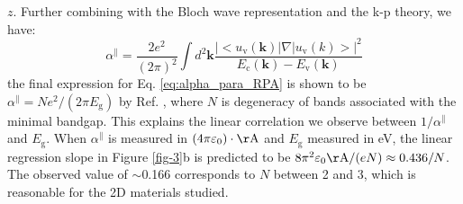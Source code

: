 \documentclass[journal=ancac3,manuscript=article,email=true,hyperref=true,keywords=false]{achemso}
\begin{document}
$z$. Further combining with the Bloch wave representation and the k-p
theory\cite{Jiang_2017_Eg_Eb}, we have:
\begin{equation}
  \label{eq:alpha_para_RPA}
  \alpha^{\parallel} = \frac{2e^{2}}
  {(2 \pi)^{2}} \int d^{2}\mathbf{k}
  \frac{|<u_{\mathrm{v}}(\mathbf{k})|\nabla|u_{\mathrm{v}}(k)>|^{2}}
  {E_{\mathrm{c}}(\mathbf{k}) - E_{\mathrm{v}}(\mathbf{k})}
\end{equation}
the final expression for Eq. \ref{eq:alpha_para_RPA} is shown to be
$\alpha^{\parallel} = N e^{2}/(2\pi E_{\mathrm{g}})$ by
Ref. , where $N$ is degeneracy of bands
associated with the minimal bandgap. This explains the linear
correlation we observe between $1/\alpha^{\parallel}$ and
$E_{\mathrm{g}}$. When $\alpha^{\parallel}$ is measured in
$(4 \pi \varepsilon_{0})\cdot \mathrm{\AA}$ and $E_{\mathrm{g}}$
measured in eV, the linear regression slope in Figure \ref{fig-3}b is
predicted to be
$8\pi^{2}\varepsilon_{0} \mathrm{\AA}/(eN) \approx 0.436/N$. The
observed value of $\sim$0.166 corresponds to $N$ between 2 and 3,
which is reasonable for the 2D materials studied.
\end{document}
